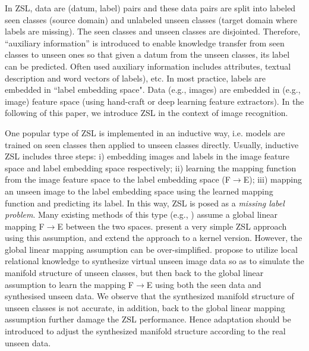 \documentclass{article}
\begin{document}
In ZSL, data are (datum, label) pairs and these data pairs are split into labeled seen classes (source domain) and unlabeled unseen classes (target domain where labels are missing). The seen classes and unseen classes are disjointed. Therefore, ``auxiliary information'' is introduced to enable knowledge transfer from seen classes to unseen ones so that given a datum from the unseen classes, its label can be predicted. Often used auxiliary information includes attributes\cite{lampert2014attribute}, textual description\cite{lei2015predicting} and word vectors of labels\cite{socher2013zero}), etc. In most practice, labels are embedded in ``label embedding space". Data (e.g., images) are embedded in (e.g., image) feature space (using hand-craft or deep learning feature extractors). In the following of this paper, we introduce ZSL in the context of image recognition.


One popular type of ZSL is implemented in an inductive way, i.e. models are trained on seen classes then applied to unseen classes directly. Usually, inductive ZSL includes three steps: i) embedding images and labels in the image feature space and label embedding space respectively; ii) learning the mapping function from the image feature space to the label embedding space (F$\rightarrow$E); iii) mapping an unseen image to the label embedding space using the learned mapping function and predicting its label. In this way, ZSL is posed as a {\em missing label problem}. Many existing methods of this type (e.g., \cite{socher2013zero}\cite{al2016recovering}\cite{qiao2016less}) assume a global linear mapping F$\rightarrow$E between the two spaces. \cite{romera2015embarrassingly} present a very simple ZSL approach using this assumption, and extend the approach to a kernel version. However, the global linear mapping assumption can be over-simplified. \cite{wang2016relational} propose to utilize local relational knowledge to synthesize virtual unseen image data so as to simulate the manifold structure of unseen classes, but then back to the global linear assumption to learn the mapping F$\rightarrow$E using both the seen data and synthesised unseen data. We observe that the synthesized manifold structure of unseen classes is not accurate, in addition, back to the global linear mapping assumption further damage the ZSL performance. Hence adaptation should be introduced to adjust the synthesized manifold structure according to the real unseen data.
\end{document}
